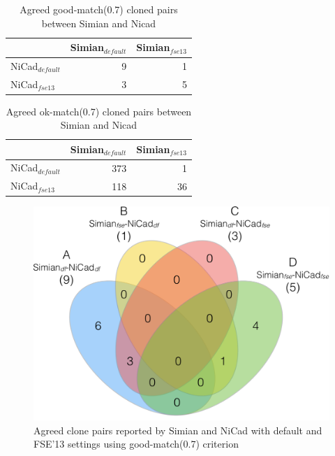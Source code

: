 \documentclass{IEEEtran}
\begin{document}
\begin{table}[h]
	\centering
	\caption{Agreed good-match(0.7) cloned pairs between Simian and Nicad}
	\label{t_agreed_good_clone_pairs}
	\begin{tabular}{l|r|r}
		\hline
		& Simian$_{\mathrm{\textit{default}}}$ & Simian$_{\mathrm{\textit{fse13}}}$ \\ %
		\hline
		NiCad$_{\mathrm{\textit{default}}}$ & 9 & 1 \\ %
		NiCad$_{\mathrm{\textit{fse13}}}$   & 3 & 5 \\ %
		\hline
	\end{tabular}
\end{table}

\begin{table}[h]
	\centering
	\caption{Agreed ok-match(0.7) cloned pairs between Simian and Nicad}
	\label{t_agreed_ok_clone_pairs}
	\begin{tabular}{l|r|r}
		\hline
		& Simian$_{\mathrm{\textit{default}}}$ & Simian$_{\mathrm{\textit{fse13}}}$ \\ %
		\hline
		NiCad$_{\mathrm{\textit{default}}}$ & 373 & 1 \\%
		NiCad$_{\mathrm{\textit{fse13}}}$   & 118 & 36 \\ %
		\hline
	\end{tabular}
\end{table}

\begin{figure}[H]
	\centering
	\includegraphics[width=0.5\linewidth]{venn4_pairs}
	\caption[Agreed clone pairs reported by Simian and NiCad with default and FSE'13 settings using good-match(0.7) criterion]{Agreed clone pairs reported by Simian and NiCad with default and FSE'13 settings using good-match(0.7) criterion}
	\label{fig:venn4_pairs}
\end{figure}
\end{document}
